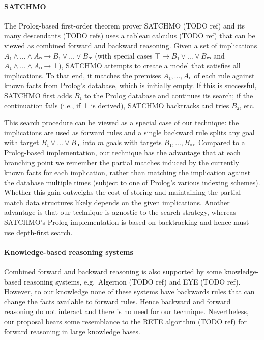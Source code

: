 \documentclass[runningheads]{llncs}
\begin{document}
\paragraph{SATCHMO}
The Prolog-based first-order theorem prover SATCHMO (TODO ref) and its many descendants (TODO refs) uses a tableau calculus (TODO ref) that can be viewed as combined forward and backward reasoning.
Given a set of implications $A₁ ∧ \dots ∧ Aₙ → B₁ ∨ \dots ∨ Bₘ$ (with special cases $⊤ → B₁ ∨ \dots ∨ Bₘ$ and $A₁ ∧ \dots ∧ Aₙ → ⊥$), SATCHMO attempts to create a model that satisfies all implications.
To that end, it matches the premises $A₁, \dots, Aₙ$ of each rule against known facts from Prolog's database, which is initially empty.
If this is successful, SATCHMO first adds $B₁$ to the Prolog database and continues its search; if the continuation fails (i.e., if $⊥$ is derived), SATCHMO backtracks and tries $B₂$, etc.

This search procedure can be viewed as a special case of our technique: the implications are used as forward rules and a single backward rule splits any goal with target $B₁ ∨ \dots ∨ Bₘ$ into $m$ goals with targets $B₁, \dots, Bₘ$.
Compared to a Prolog-based implementation, our technique has the advantage that at each branching point we remember the partial matches induced by the currently known facts for each implication, rather than matching the implication against the database multiple times (subject to one of Prolog's various indexing schemes).
Whether this gain outweighs the cost of storing and maintaining the partial match data structures likely depends on the given implications.
Another advantage is that our technique is agnostic to the search strategy, whereas SATCHMO's Prolog implementation is based on backtracking and hence must use depth-first search.

\paragraph{Knowledge-based reasoning systems}
Combined forward and backward reasoning is also supported by some knowledge-based reasoning systems, e.g.\ Algernon (TODO ref) and EYE (TODO ref).
However, to our knowledge none of these systems have backwards rules that can change the facts available to forward rules.
Hence backward and forward reasoning do not interact and there is no need for our technique.
Nevertheless, our proposal bears some resemblance to the RETE algorithm (TODO ref) for forward reasoning in large knowledge bases.
\end{document}
